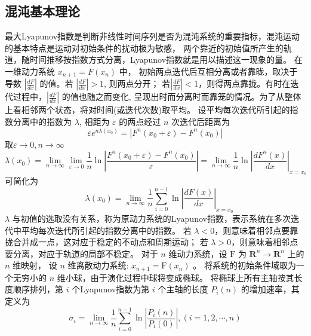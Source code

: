 \subsection{混沌基本理论}
最大Lyapunov指数是判断非线性时间序列是否为混沌系统的重要指标，混沌运动的基本特点是运动对初始条件的扰动极为敏感，
两个靠近的初始值所产生的轨道，随时间推移按指数方式分离，Lyapunov指数就是用以描述这一现象的量。
在一维动力系统 $x_{n+1}=F\left(x_{n}\right)$ 中， 初始两点迭代后互相分离或者靠昽，取决于导数
$\left|\frac{d F}{d x}\right|$ 的值。若 $\left|\frac{d F}{d x}\right|>1$, 则两点分开；
若$\left|\frac{d F}{d x}\right|<1$，则得两点靠拢。有时在迭代过程中，$\left|\frac{d F}{d x}\right|$ 
的值也随之而变化, 呈现出时而分离时而靠笼的情况。为了从整体上看相邻两个状态，将对时间(或迭代次数)取平均。
设平均每次迭代所引起的指数分离中的指数为 $\lambda$, 相距为 $\varepsilon$ 的两点经过 $n$ 次迭代后距离为
\begin{equation}
    \varepsilon e^{n \lambda\left(x_{0}\right)}=\left|F^{n}\left(x_{0}+\varepsilon\right)-F^{n}\left(x_{0}\right)\right|
\end{equation}
取$\varepsilon \rightarrow 0, n \rightarrow \infty$
\begin{equation}
    \lambda\left(x_{0}\right)=\lim _{n \rightarrow \infty} \lim _{\varepsilon \rightarrow 0}
     \frac{1}{n} \ln \left|\frac{F^{n}\left(x_{0}+\varepsilon\right)-F^{n}\left(x_{0}\right)}
     {\varepsilon}\right|=\lim _{n \rightarrow \infty} \frac{1}{n} \ln \left|\frac{d F^{n}(x)}{d x}
     \right|_{x=x_{0}}
\end{equation}
可简化为
\begin{equation}
    \quad \lambda\left(x_{0}\right)=\lim _{n \rightarrow \infty} \frac{1}{n} \sum_{i=0}^{n-1} \ln \left|\frac{d F(x)}{d x}\right|_{x=x_{0}}
\end{equation} 
$\lambda$ 与初值的选取没有关系，称为原动力系统的Lyapunov指数，表示系统在多次迭代中平均每次迭代所引起的指数分离中的指数。
若 $\lambda<0$，则意味着相邻点要靠拢合并成一点，这对应于稳定的不动点和周期运动；
若 $\lambda>0$，则意味着相邻点要分离，对应于轨道的局部不稳定。
对于 $n$ 维动力系统，设 $\mathrm{F}$ 为 $\mathbf{R}^{n} \rightarrow \mathbf{R}^{n}$ 上的 $n$ 维映射，
设 $n$ 维离散动力系统: $x_{n+1}=\mathrm{F}\left(x_{n}\right)$ 。
将系统的初始条件域取为一个无穷小的 $n$ 维小球，由于演化过程中球将变成椭球。
将椭球上所有主轴按其长度顺序排列，第 $i$ 个Lyapunov指数为第 $i$ 个主轴的长度 $P_{i}(n)$ 的增加速率，其定义为
\begin{equation}
    \sigma_{i}=\lim _{n \rightarrow \infty} \frac{1}{n} \sum_{i=0}^{n-1} \ln \left|\frac{P_{i}(n)}{P_{i}(0)}\right|,(i=1,2, \cdots, n)
\end{equation}
